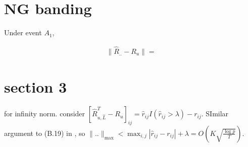 \section{NG banding}
Under event $A_1$, 

\begin{equation}
    \begin{split}
        \| \hat R_{..} - R_u \| = 
    \end{split}
\end{equation}

\section{section 3}
for infinity norm.  consider $[\hat R^T_{u, \hat L} - R_u]_{ij} = \hat r_{ij} I(\hat r_{ij} > \lambda) - r_{ij}$. 
SImilar argument to (B.19) in \cite{fanHighDimensionalCovarianceMatrix2011}, so $\|..\|_\max < \max_{i,j} |\hat r_{ij} - r_{ij}| + \lambda = O(K\sqrt{\frac{\log p}{T}})$.
